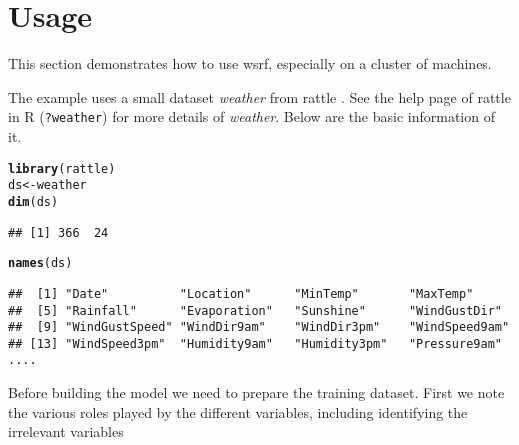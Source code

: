 \documentclass[11pt,a4paper]{article}\usepackage{graphicx, color}
\makeatletter
\newcommand{\hlfunctioncall}[1]{\textcolor[rgb]{0.501960784313725,0,0.329411764705882}{\textbf{#1}}}%
\newenvironment{kframe}{%
 \def\at@end@of@kframe{}%
 \ifinner\ifhmode%
  \def\at@end@of@kframe{\end{minipage}}%
  \begin{minipage}{\columnwidth}%
 \fi\fi%
 \def\FrameCommand##1{\hskip\@totalleftmargin \hskip-\fboxsep
 \colorbox{shadecolor}{##1}\hskip-\fboxsep
     \hskip-\linewidth \hskip-\@totalleftmargin \hskip\columnwidth}%
 \MakeFramed {\advance\hsize-\width
   \@totalleftmargin\z@ \linewidth\hsize
   \@setminipage}}%
 {\par\unskip\endMakeFramed%
 \at@end@of@kframe}
\newenvironment{knitrout}{}{} %
\newcommand{\proglang}[1]{\textsf{#1}}
\newcommand{\code}[1]{\texttt{#1}}
\newcommand{\Rdataset}[1]{\textit{#1}}
\newcommand{\pkg}[1]{{\fontseries{b}\selectfont #1}}
\makeatother
\begin{document}
\section{Usage} \label{sec:package}

This section demonstrates how to use \pkg{wsrf}, especially on a
cluster of machines.

The example uses a small dataset \Rdataset{weather} from \pkg{rattle}
\citep{rattle}.  See the help page of \pkg{rattle} in \proglang{R}
(\code{?weather}) for more details of \Rdataset{weather}.  Below are
the basic information of it.

\begin{knitrout}
\color{fgcolor}\begin{kframe}
\begin{alltt}
\hlfunctioncall{library}(rattle)
ds <- weather
\hlfunctioncall{dim}(ds)
\end{alltt}
\begin{verbatim}
## [1] 366  24
\end{verbatim}
\begin{alltt}
\hlfunctioncall{names}(ds)
\end{alltt}
\begin{verbatim}
##  [1] "Date"          "Location"      "MinTemp"       "MaxTemp"      
##  [5] "Rainfall"      "Evaporation"   "Sunshine"      "WindGustDir"  
##  [9] "WindGustSpeed" "WindDir9am"    "WindDir3pm"    "WindSpeed9am" 
## [13] "WindSpeed3pm"  "Humidity9am"   "Humidity3pm"   "Pressure9am"  
....
\end{verbatim}
\end{kframe}
\end{knitrout}


Before building the model we need to prepare the training dataset.
First we note the various roles played by the different variables,
including identifying the irrelevant variables
\end{document}
